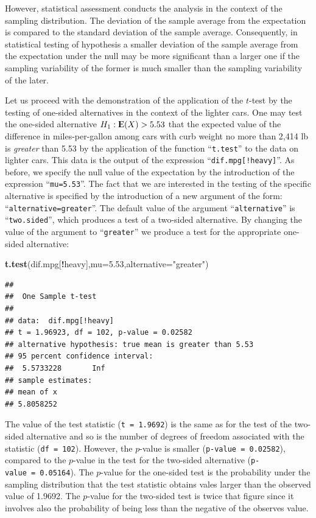 \documentclass[]{krantz}
\makeatletter
\newenvironment{Shaded}{\begin{snugshade}}{\end{snugshade}}
\newcommand{\DataTypeTok}[1]{\textcolor[rgb]{0.13,0.29,0.53}{#1}}
\newcommand{\FloatTok}[1]{\textcolor[rgb]{0.00,0.00,0.81}{#1}}
\newcommand{\KeywordTok}[1]{\textcolor[rgb]{0.13,0.29,0.53}{\textbf{#1}}}
\newcommand{\NormalTok}[1]{#1}
\newcommand{\OperatorTok}[1]{\textcolor[rgb]{0.81,0.36,0.00}{\textbf{#1}}}
\newcommand{\StringTok}[1]{\textcolor[rgb]{0.31,0.60,0.02}{#1}}
\newcommand{\Expec}{{\rm I\kern-.3em E}}
\newenvironment{kframe}{%
\medskip{}
\setlength{\fboxsep}{.8em}
 \def\at@end@of@kframe{}%
 \ifinner\ifhmode%
  \def\at@end@of@kframe{\end{minipage}}%
  \begin{minipage}{\columnwidth}%
 \fi\fi%
 \def\FrameCommand##1{\hskip\@totalleftmargin \hskip-\fboxsep
 \colorbox{shadecolor}{##1}\hskip-\fboxsep
     \hskip-\linewidth \hskip-\@totalleftmargin \hskip\columnwidth}%
 \MakeFramed {\advance\hsize-\width
   \@totalleftmargin\z@ \linewidth\hsize
   \@setminipage}}%
 {\par\unskip\endMakeFramed%
 \at@end@of@kframe}
\renewenvironment{Shaded}{\begin{kframe}}{\end{kframe}}
\theoremstyle{definition}
\theoremstyle{definition}
\theoremstyle{definition}
\theoremstyle{remark}
\makeatother
\begin{document}
However, statistical assessment conducts the analysis in the context of
the sampling distribution. The deviation of the sample average from the
expectation is compared to the standard deviation of the sample average.
Consequently, in statistical testing of hypothesis a smaller deviation
of the sample average from the expectation under the null may be more
significant than a larger one if the sampling variability of the former
is much smaller than the sampling variability of the later.

Let us proceed with the demonstration of the application of the \(t\)-test
by the testing of one-sided alternatives in the context of the lighter
cars. One may test the one-sided alternative \(H_1:\Expec(X) > 5.53\) that
the expected value of the difference in miles-per-gallon among cars with
curb weight no more than 2,414 lb is \emph{greater} than 5.53 by the
application of the function ``\texttt{t.test}'' to the data on lighter cars. This
data is the output of the expression ``\texttt{dif.mpg{[}!heavy{]}}''. As before, we
specify the null value of the expectation by the introduction of the
expression ``\texttt{mu=5.53}''. The fact that we are interested in the testing
of the specific alternative is specified by the introduction of a new
argument of the form: ``\texttt{alternative=greater}''. The default value of the
argument ``\texttt{alternative}'' is ``\texttt{two.sided}'', which produces a test of a
two-sided alternative. By changing the value of the argument to
``\texttt{greater}'' we produce a test for the appropriate one-sided alternative:

\begin{Shaded}
\begin{Highlighting}[]
\KeywordTok{t.test}\NormalTok{(dif.mpg[}\OperatorTok{!}\NormalTok{heavy],}\DataTypeTok{mu=}\FloatTok{5.53}\NormalTok{,}\DataTypeTok{alternative=}\StringTok{"greater"}\NormalTok{)}
\end{Highlighting}
\end{Shaded}

\begin{verbatim}
## 
##  One Sample t-test
## 
## data:  dif.mpg[!heavy]
## t = 1.96923, df = 102, p-value = 0.02582
## alternative hypothesis: true mean is greater than 5.53
## 95 percent confidence interval:
##  5.5733228       Inf
## sample estimates:
## mean of x 
## 5.8058252
\end{verbatim}

The value of the test statistic (\texttt{t\ =\ 1.9692}) is the same as for the
test of the two-sided alternative and so is the number of degrees of
freedom associated with the statistic (\texttt{df\ =\ 102}). However, the
\(p\)-value is smaller (\texttt{p-value\ =\ 0.02582}), compared to the \(p\)-value in
the test for the two-sided alternative (\texttt{p-value\ =\ 0.05164}). The
\(p\)-value for the one-sided test is the probability under the sampling
distribution that the test statistic obtains vales larger than the
observed value of 1.9692. The \(p\)-value for the two-sided test is twice
that figure since it involves also the probability of being less than
the negative of the observes value.
\end{document}
